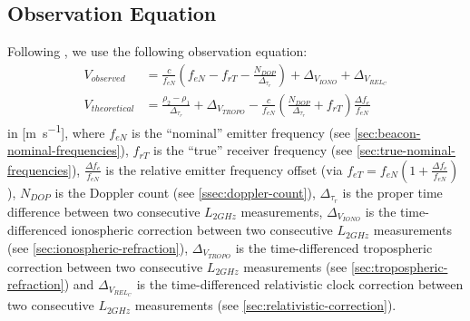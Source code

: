 \subsection{Observation Equation}
\label{ssec:observation-equation}
Following \cite{lemoine-2016}, we use the following observation equation:
\begin{equation}
  \begin{aligned}
    V_{observed} &= \frac{c}{f_{eN}} 
      \left( f_{eN} - f_{rT} - \frac{N_{DOP}}{\Delta _{\tau_r}} \right)
      + \Delta _{V_{IONO}} + \Delta _{V_{REL_C}}\\
    V_{theoretical} &= \frac{\rho_2 - \rho_1}{\Delta _{\tau_r}} + \Delta _{V_{TROPO}} 
      - \frac{c}{f_{eN}} \left( \frac{N_{DOP}}{\Delta _{\tau_r}} + f_{rT} \right) 
      \frac{\Delta f_e}{f_{eN}}
  \end{aligned}
\end{equation}
in [\si{\m \per \s}], where $f_{eN}$ is the ``nominal'' emitter frequency (see \ref{sec:beacon-nominal-frequencies}), 
$f_{rT}$ is the ``true'' receiver frequency (see \ref{sec:true-nominal-frequencies}), 
$\frac{\Delta f_e}{f_{eN}}$ is the relative emitter frequency offset  
(via $f_{eT} = f_{eN} \left( 1 + \frac{\Delta f_e}{f_{eN}} \right)$), 
$N_{DOP}$ is the Doppler count (see \ref{ssec:doppler-count}), $\Delta _{\tau_r}$ 
is the proper time difference between two consecutive $L_{2GHz}$ measurements, 
$\Delta _{V_{IONO}}$ is the time-differenced ionospheric correction between two 
consecutive $L_{2GHz}$ measurements (see \ref{sec:ionospheric-refraction}), 
$\Delta _{V_{TROPO}}$ is the time-differenced tropospheric correction between 
two consecutive $L_{2GHz}$ measurements (see \ref{sec:tropospheric-refraction}) 
and $\Delta _{V_{REL_C}}$ is the time-differenced relativistic clock correction 
between two consecutive $L_{2GHz}$ measurements (see \ref{sec:relativistic-correction}).

%

